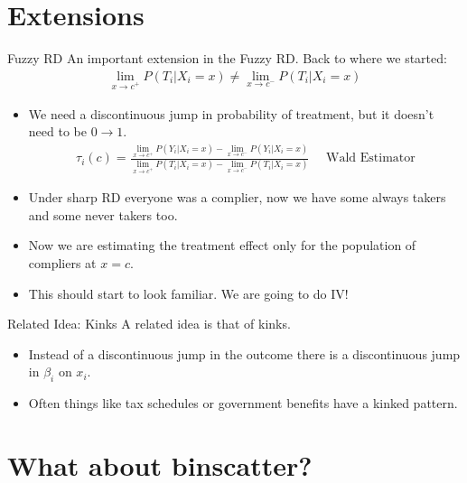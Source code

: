 \documentclass[xcolor=pdftex,dvipsnames,table,mathserif,aspectratio=169]{beamer}
\begin{document}
\section{Extensions}
\begin{frame}{Fuzzy RD}
\small 
An important extension in the \alert{Fuzzy RD}.   Back to where we started:
\begin{eqnarray*}
\lim_{x\rightarrow c^{+}} P(T_i | X_i = x) \neq \lim_{x\rightarrow c^{-}}P(T_i | X_i = x)
\end{eqnarray*}
\begin{itemize}
\item We need a discontinuous jump in probability of treatment, but it doesn't need to be $0 \rightarrow 1$.
\begin{eqnarray*}
\tau_i(c) = \frac{\lim_{x\rightarrow c^{+}} P(Y_i | X_i = x) - \lim_{x\rightarrow c^{-}}P(Y_i | X_i = x)}{\lim_{x\rightarrow c^{+}} P(T_i | X_i = x) - \lim_{x\rightarrow c^{-}}P(T_i | X_i = x)}
\quad \text{ Wald Estimator}
\end{eqnarray*}
\item Under sharp RD everyone was a \alert{complier}, now we have some \alert{always takers} and some \alert{never takers} too.
\item Now we are estimating the treatment effect only for the population of compliers at $x=c$.
\item This should start to look familiar. We are going to do IV!
\end{itemize}
\end{frame}

\begin{frame}{Related Idea: Kinks}
 A related idea is that of \alert{kinks}. 
\begin{itemize}
\item Instead of a discontinuous jump in the outcome there is a discontinuous jump in $\beta_i$ on $x_i$.
\item Often things like tax schedules or government benefits have a kinked pattern.
\end{itemize}
\end{frame}

\section{What about binscatter?}
\end{document}
